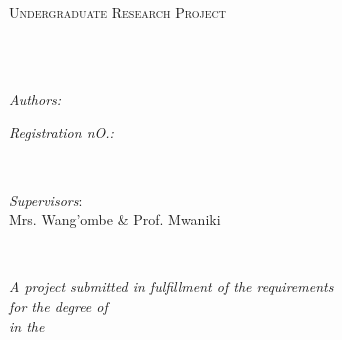 \documentclass[
openany,
12pt, %
english, %
singlespacing, %
liststotoc, %
toctotoc, %
parskip, %
headsepline, %
]{MastersDoctoralThesis} %
\author{Eric Cheruiyot\\
Elvin Matovu\\
Shaffy Achayo \\
Abdulaziz Sharif\\
Mohamed Abdirahman
} %
\begin{document}
\frontmatter %

\pagestyle{plain} %


\begin{titlepage}
\begin{center}

\vspace*{.06\textheight}
{\scshape\LARGE \univname\par}\vspace{1.5cm} %
\textsc{\Large Undergraduate Research Project}\\[0.5cm] %

\HRule \\[0.4cm] %
{\huge \bfseries \ttitle\par}\vspace{0.4cm} %
\HRule \\[1.5cm] %
 
\begin{minipage}[t]{0.4\textwidth}
\begin{flushleft} \large
\emph{Authors:}\\
{\authorname} %
\end{flushleft}
\end{minipage}
\begin{minipage}[t]{0.4\textwidth}
\begin{flushright} \large
\emph{Registration nO.:} 
{\supname} %


\end{flushright}
\end{minipage}\\[1cm]
\begin{minipage}[t]{0.4\textwidth}
\begin{flushleft} \large
\emph{Supervisors}:\\Mrs. Wang'ombe \& Prof. Mwaniki\\
\end{flushleft}
\end{minipage}\\[2cm]

 
\vfill

\large \textit{A project submitted in fulfillment of the requirements\\ for the degree of \degreename}\\[0.3cm] %
\textit{in the}\\[0.4cm]
\deptname\\[2cm] %
 
\vfill


 
\vfill
\end{center}
\end{titlepage}
\end{document}
